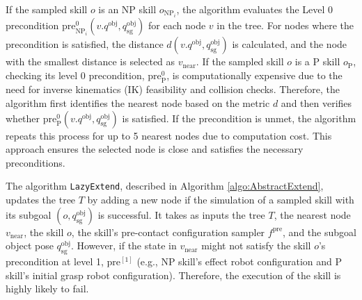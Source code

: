 If the sampled skill \( o \) is an NP skill \( o_{\text{NP}_i} \), the algorithm evaluates the Level 0 precondition \( \mathrm{pre}^{0}_{\text{NP}_i}(v.q^{\text{obj}}, q^{\text{obj}}_{\text{sg}}) \) for each node \( v \) in the tree. For nodes where the precondition is satisfied, the distance \( d(v.q^{\text{obj}}, q^{\text{obj}}_{\text{sg}}) \) is calculated, and the node with the smallest distance is selected as \( v_\text{near} \). If the sampled skill \( o \) is a P skill \( o_{\text{P}} \), checking its level 0 precondition, \( \mathrm{pre}^{0}_{\text{P}} \), is computationally expensive due to the need for inverse kinematics (IK) feasibility and collision checks. Therefore, the algorithm first identifies the nearest node based on the metric \( d \) and then verifies whether \( \mathrm{pre}^{0}_{\text{P}}(v.q^{\text{obj}}, q^{\text{obj}}_{\text{sg}}) \) is satisfied. If the precondition is unmet, the algorithm repeats this process for up to 5 nearest nodes due to computation cost. This approach ensures the selected node is close and satisfies the necessary preconditions.

The algorithm \texttt{LazyExtend}, described in Algorithm \ref{algo:AbstractExtend}, updates the tree \( T \) by adding a new node if the simulation of a sampled skill with its subgoal \( (o, q^\text{obj}_\text{sg}) \) is successful. It takes as inputs the tree \( T \), the nearest node \( v_\text{near} \), the skill \( o \), the skill's pre-contact configuration sampler \( f^\text{pre} \), and the subgoal object pose \( q^\text{obj}_\text{sg} \). However, if the state in \( v_\text{near} \) might not satisfy the skill \( o \)'s precondition at level 1, \( \text{pre}^{[1]} \) (e.g., NP skill's effect robot configuration and P skill's initial grasp robot configuration). Therefore, the execution of the skill is highly likely to fail.

